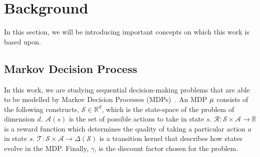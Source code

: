 \section{Background}\label{sec:background}

In this section, we will be introducing important concepts on which this work is based upon.

\subsection{Markov Decision Process}

In this work, we are studying sequential decision-making problems that are able to be modelled by Markov Decision Processes (MDPs)~\cite{Sutton2018}. An MDP $\mu$ consists of the following constructs, $\mathcal{S} \in \mathbb{R}^d$, which is the state-space of the problem of dimension $d$. $\mathcal{A}(s)$ is the set of possible actions to take in state $s$. $\mathcal{R} : \mathcal{S}\times\mathcal{A}\rightarrow \mathbb{R}$ is a reward function which determines the quality of taking a particular action $a$ in state $s$. $\mathcal{T} : \mathcal{S}\times \mathcal{A} \rightarrow \Delta(\mathcal{S})$ is a transition kernel that describes how states evolve in the MDP. Finally, $\gamma$, is the discount factor chosen for the problem.

